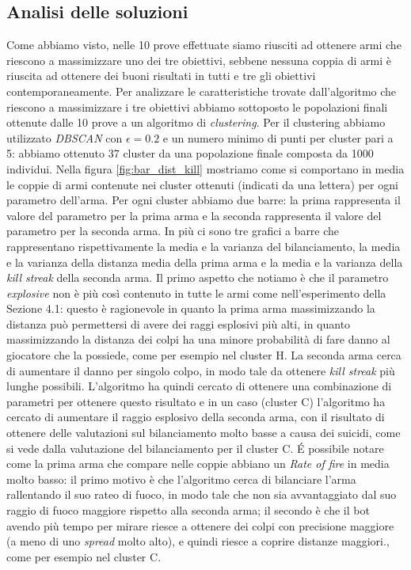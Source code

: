 \documentclass[12pt, italian]{toptesi}
\begin{document}
\subsection{Analisi delle soluzioni}
Come abbiamo visto, nelle 10 prove effettuate siamo riusciti ad ottenere armi che riescono a massimizzare uno dei tre obiettivi, sebbene nessuna coppia di armi è riuscita ad ottenere dei buoni risultati in tutti e tre gli obiettivi contemporaneamente.
Per analizzare le caratteristiche trovate dall'algoritmo che riescono a massimizzare i tre obiettivi abbiamo sottoposto le popolazioni finali ottenute dalle 10 prove a un algoritmo di \emph{clustering}.
Per il clustering abbiamo utilizzato \emph{DBSCAN} con $\epsilon = 0.2$ e un numero minimo di punti per cluster pari a 5: abbiamo ottenuto 37 cluster da una popolazione finale composta da 1000 individui.
Nella figura \ref{fig:bar_dist_kill} mostriamo come si comportano in media le coppie di armi contenute nei cluster ottenuti (indicati da una lettera) per ogni parametro dell'arma. Per ogni cluster abbiamo due barre: la prima rappresenta il valore del parametro per la prima arma e la seconda rappresenta il valore del parametro per la seconda arma. In più ci sono tre grafici a barre che rappresentano rispettivamente la media e la varianza del bilanciamento, la media e la varianza della distanza media della prima arma e la media e la varianza della \emph{kill streak} della seconda arma.
Il primo aspetto che notiamo è che il parametro \emph{explosive} non è più così contenuto in tutte le armi come nell'esperimento della Sezione 4.1: questo è ragionevole in quanto la prima arma massimizzando la distanza può permettersi di avere dei raggi esplosivi più alti, in quanto massimizzando la distanza dei colpi ha una minore probabilità di fare danno al giocatore che la possiede, come per esempio nel cluster H.
La seconda arma cerca di aumentare il danno per singolo colpo, in modo tale da ottenere \emph{kill streak} più lunghe possibili. L'algoritmo ha quindi cercato di ottenere una combinazione di parametri per ottenere questo risultato e in un caso (cluster C) l'algoritmo ha cercato di aumentare il raggio esplosivo della seconda arma, con il risultato di ottenere delle valutazioni sul bilanciamento molto basse a causa dei suicidi, come si vede dalla valutazione del bilanciamento per il cluster C.
\'E possibile notare come la prima arma che compare nelle coppie abbiano un \emph{Rate of fire} in media molto basso: il primo motivo è che l'algoritmo cerca di bilanciare l'arma rallentando il suo rateo di fuoco, in modo tale che non sia avvantaggiato dal suo raggio di fuoco maggiore rispetto alla seconda arma; il secondo è che il bot avendo più tempo per mirare riesce a ottenere dei colpi con precisione maggiore (a meno di uno \emph{spread} molto alto), e quindi riesce a coprire distanze maggiori., come per esempio nel cluster C.
\end{document}
